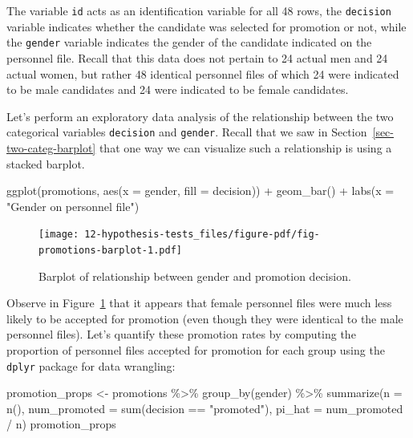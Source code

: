 \documentclass[
  letterpaper,
  DIV=11,
  numbers=noendperiod]{scrreprt}
\newenvironment{Shaded}{\begin{snugshade}}{\end{snugshade}}
\newcommand{\AttributeTok}[1]{\textcolor[rgb]{0.40,0.45,0.13}{#1}}
\newcommand{\FunctionTok}[1]{\textcolor[rgb]{0.28,0.35,0.67}{#1}}
\newcommand{\NormalTok}[1]{\textcolor[rgb]{0.00,0.23,0.31}{#1}}
\newcommand{\OtherTok}[1]{\textcolor[rgb]{0.00,0.23,0.31}{#1}}
\newcommand{\SpecialCharTok}[1]{\textcolor[rgb]{0.37,0.37,0.37}{#1}}
\newcommand{\StringTok}[1]{\textcolor[rgb]{0.13,0.47,0.30}{#1}}
\theoremstyle{definition}
\theoremstyle{remark}
\begin{document}
The variable \texttt{id} acts as an identification variable for all 48
rows, the \texttt{decision} variable indicates whether the candidate was
selected for promotion or not, while the \texttt{gender} variable
indicates the gender of the candidate indicated on the personnel file.
Recall that this data does not pertain to 24 actual men and 24 actual
women, but rather 48 identical personnel files of which 24 were
indicated to be male candidates and 24 were indicated to be female
candidates.

Let's perform an exploratory data analysis of the relationship between
the two categorical variables \texttt{decision} and \texttt{gender}.
Recall that we saw in Section~\ref{sec-two-categ-barplot} that one way
we can visualize such a relationship is using a stacked barplot.

\begin{Shaded}
\begin{Highlighting}[]
\FunctionTok{ggplot}\NormalTok{(promotions, }\FunctionTok{aes}\NormalTok{(}\AttributeTok{x =}\NormalTok{ gender, }\AttributeTok{fill =}\NormalTok{ decision)) }\SpecialCharTok{+}
  \FunctionTok{geom\_bar}\NormalTok{() }\SpecialCharTok{+}
  \FunctionTok{labs}\NormalTok{(}\AttributeTok{x =} \StringTok{"Gender on personnel file"}\NormalTok{)}
\end{Highlighting}
\end{Shaded}

\begin{figure}[H]

{\centering \texttt{[image: 12-hypothesis-tests\_files/figure-pdf/fig-promotions-barplot-1.pdf]}

}

\caption{\label{fig-promotions-barplot}Barplot of relationship between
gender and promotion decision.}

\end{figure}

Observe in Figure~\ref{fig-promotions-barplot} that it appears that
female personnel files were much less likely to be accepted for
promotion (even though they were identical to the male personnel files).
Let's quantify these promotion rates by computing the proportion of
personnel files accepted for promotion for each group using the
\texttt{dplyr} package for data wrangling:

\begin{Shaded}
\begin{Highlighting}[]
\NormalTok{promotion\_props }\OtherTok{\textless{}{-}}\NormalTok{ promotions }\SpecialCharTok{\%\textgreater{}\%}
  \FunctionTok{group\_by}\NormalTok{(gender) }\SpecialCharTok{\%\textgreater{}\%}
  \FunctionTok{summarize}\NormalTok{(}\AttributeTok{n =} \FunctionTok{n}\NormalTok{(),}
            \AttributeTok{num\_promoted =} \FunctionTok{sum}\NormalTok{(decision }\SpecialCharTok{==} \StringTok{"promoted"}\NormalTok{),}
            \AttributeTok{pi\_hat =}\NormalTok{ num\_promoted }\SpecialCharTok{/}\NormalTok{ n)}
\NormalTok{promotion\_props}
\end{Highlighting}
\end{Shaded}
\end{document}
